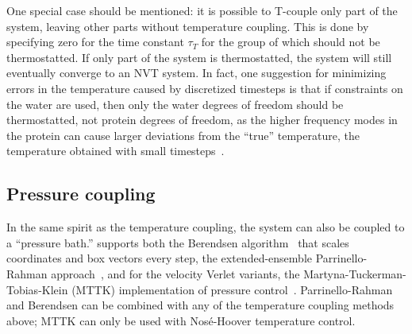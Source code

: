 \documentclass[11pt,a4paper,twoside]{article}
\begin{document}
One special case should be mentioned: it is possible to T-couple only
part of the system, leaving other parts without temperature
coupling. This is done by specifying zero for the time constant
$\tau_T$ for the group of which should not be thermostatted.  If only
part of the system is thermostatted, the system will still eventually
converge to an NVT system.  In fact, one suggestion for minimizing
errors in the temperature caused by discretized timesteps is that if
constraints on the water are used, then only the water degrees of
freedom should be thermostatted, not protein degrees of freedom, as
the higher frequency modes in the protein can cause larger deviations
from the ``true'' temperature, the temperature obtained with small
timesteps~\cite{Eastwood2010}.

\subsection{Pressure coupling}
In the same spirit as the temperature coupling, the system can also be
coupled to a ``pressure bath.'' {\gromacs} supports both the Berendsen
algorithm~\cite{Berendsen84} that scales coordinates and box vectors
every step, the extended-ensemble Parrinello-Rahman approach~\cite{Parrinello81,Nose83}, and for
the velocity Verlet variants, the Martyna-Tuckerman-Tobias-Klein
(MTTK) implementation of pressure
control~\cite{Martyna1996}. Parrinello-Rahman and Berendsen can be
combined with any of the temperature coupling methods above; MTTK can
only be used with Nos{\'e}-Hoover temperature control.
\end{document}
